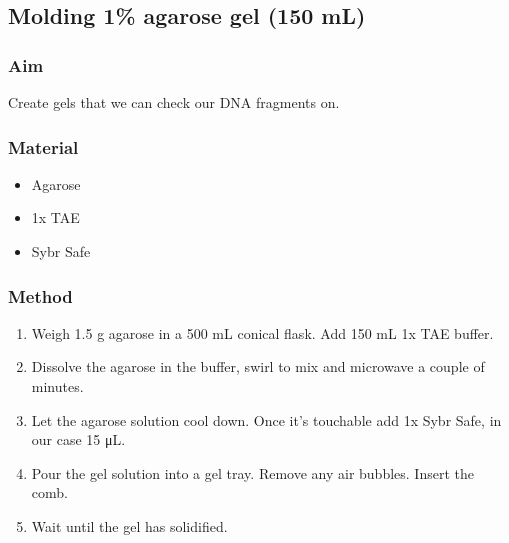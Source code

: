 \subsection{Molding 1\% agarose gel (150 mL)}
\label{sec:Molding_agarose_gel}
\subsubsection*{Aim}
Create gels that we can check our DNA fragments on.
\subsubsection*{Material}

\begin{itemize}
    \item Agarose
    \item 1x TAE 
    \item Sybr Safe
\end{itemize}

\subsubsection*{Method}
\begin{enumerate}
    \item Weigh 1.5 g agarose in a 500 mL conical flask. Add 150 mL 1x TAE buffer.
    \item Dissolve the agarose in the buffer, swirl to mix and microwave a couple of minutes. 
    \item Let the agarose solution cool down. Once it's touchable add 1x Sybr Safe, in our case 15 \si{\micro\liter}.
    \item Pour the gel solution into a gel tray. Remove any air bubbles. Insert the comb.
    \item Wait until the gel has solidified. 
\end{enumerate}
\newpage